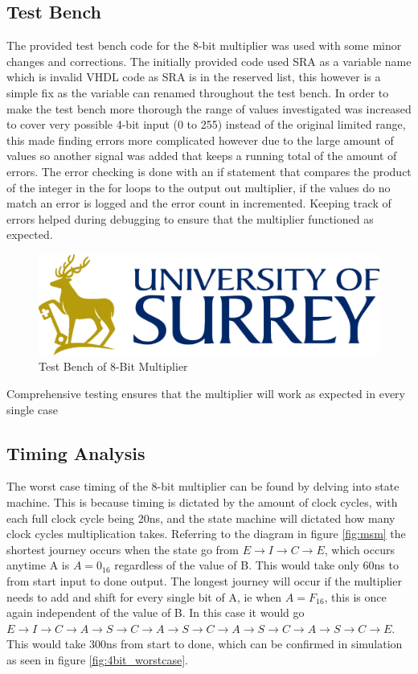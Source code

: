 \documentclass[11pt]{article}
\begin{document}
\subsection{Test Bench}
The provided test bench code for the 8-bit multiplier was used with some minor changes and corrections.
The initially provided code used SRA as a variable name which is invalid VHDL code as SRA is in the reserved list,
this however is a simple fix as the variable can renamed throughout the test bench.
In order to make the test bench more thorough the range of values investigated was increased to cover very possible 4-bit input (0 to 255) instead of the original limited range,
this made finding errors more complicated however due to the large amount of values so another signal was added that keeps a running total of the amount of errors.
The error checking is done with an if statement that compares the product of the integer in the for loops to the output out multiplier,
if the values do no match an error is logged and the error count in incremented. 
Keeping track of errors helped during debugging to ensure that the multiplier functioned as expected. 

\begin{figure}[H]        
    \centering
    \includegraphics[width=.5\textwidth]{Logo.png}
    \caption{Test Bench of 8-Bit Multiplier}
    \label{fig:4bit_testbench}
\end{figure} 

Comprehensive testing ensures that the multiplier will work as expected in every single case

\subsection{Timing Analysis}

The worst case timing of the 8-bit multiplier can be found by delving into state machine. 
This is because timing is dictated by the amount of clock cycles, with each full clock cycle being 20ns, and the state machine will dictated how many clock cycles multiplication takes.
Referring to the diagram in figure \ref{fig:msm} the shortest journey occurs when the state go from $E \rightarrow I \rightarrow C \rightarrow E$, which occurs anytime A is $A = 0_{16}$ regardless of the value of B.
This would take only 60ns to from start input to done output.
The longest journey will occur if the multiplier needs to add and shift for every single bit of A, ie when $A = F_{16}$, this is once again independent of the value of B.
In this case it would go $E \rightarrow I \rightarrow C \rightarrow A \rightarrow S \rightarrow C \rightarrow A \rightarrow S \rightarrow C \rightarrow A \rightarrow S \rightarrow C \rightarrow A \rightarrow S \rightarrow C \rightarrow E$.
This would take 300ns from start to done, which can be confirmed in simulation as seen in figure \ref{fig:4bit_worstcase}.
\end{document}

